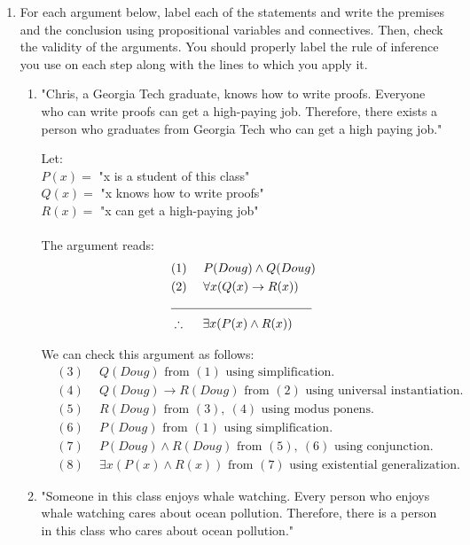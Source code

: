 \documentclass{article}
\begin{document}
\begin{enumerate}

    \item For each argument below, label each of the statements and write the premises and the conclusion using propositional variables and connectives. Then, check the validity of the arguments. You should properly label the rule of inference you use on each step along with the lines to which you apply it. 
    \begin{enumerate}
        \item "Chris, a Georgia Tech graduate, knows how to write proofs. Everyone who can write proofs can get a high-paying job. Therefore, there exists a person who graduates from Georgia Tech who can get a high paying job." 
        
        \begin{mdframed}
        Let:\\
        $P(x) = $ "x is a student of this class" \\
        $Q(x) = $ "x knows how to write proofs" \\
        $R(x) = $ "x can get a high-paying job" \\
        \\
    The argument reads:
\begin{align*}
& (1) \quad ~P(Doug)\wedge Q(Doug) \\
& (2) \quad ~\forall x(Q(x)\rightarrow R(x))\\
& \noindent\rule{4cm}{0.4pt}\\
& \therefore \quad ~ \exists x(P(x)\wedge R(x))
\end{align*}

We can check this argument as follows: \\
\begin{align*}
& (3) \quad ~Q(Doug) \mbox{ from $(1)$ using simplification.} \\
& (4) \quad ~Q(Doug)\rightarrow R(Doug) \mbox{ from $(2)$ using universal instantiation.}\\
& (5) \quad ~R(Doug) \mbox{ from $(3),~(4)$ using modus ponens.}\\
& (6) \quad ~P(Doug) \mbox{ from $(1)$ using simplification.}\\
& (7) \quad ~P(Doug)\wedge R(Doug) \mbox{ from $(5),~(6)$ using conjunction.}\\
& (8) \quad ~ \exists x(P(x)\wedge R(x)) \mbox{ from $(7)$ using existential generalization.}
\end{align*}
        \end{mdframed}
        \item "Someone in this class enjoys whale watching. Every person who enjoys whale watching cares about ocean pollution. Therefore, there is a person in this class who cares about ocean pollution."
        \begin{mdframed}
        

\end{mdframed}
\end{enumerate}
\end{enumerate}
\end{document}

